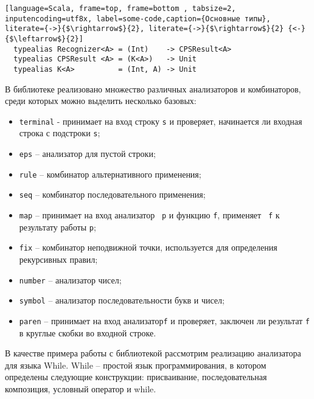 \documentclass[14pt]{matmex-diploma}
\begin{document}
  \begin{lstlisting}[language=Scala, frame=top, frame=bottom , tabsize=2, inputencoding=utf8x, label=some-code,caption={Основные типы}, literate={->}{$\rightarrow$}{2}, literate={->}{$\rightarrow$}{2} {<-}{$\leftarrow$}{2}]
  typealias Recognizer<A> = (Int)    -> CPSResult<A> 
  typealias CPSResult <A> = (K<A>)   -> Unit
  typealias K<A>          = (Int, A) -> Unit
  \end{lstlisting}
  
  В библиотеке реализовано множество различных анализаторов и комбинаторов, среди которых можно выделить несколько базовых:
  \begin{itemize}
      \item \lstinline[language=Scala]{terminal} - принимает на вход строку \lstinline[language=Scala]{s} и проверяет, начинается ли входная строка с подстроки \lstinline[language=Scala]{s};
      \item \lstinline[language=Scala]{eps} -- анализатор для пустой строки;
      \item \lstinline[language=Scala]{rule} -- комбинатор альтернативного применения;
      \item \lstinline[language=Scala]{seq} -- комбинатор последовательного применения;
      \item \lstinline[language=Scala]{map} -- принимает на вход анализатор \lstinline[language=Scala]{ p} и функцию \lstinline[language=Scala]{f}, применяет \lstinline[language=Scala]{ f} к результату работы \lstinline[language=Scala]{p};
      \item \lstinline[language=Scala]{fix} -- комбинатор неподвижной точки, используется для определения рекурсивных правил;
      \item \lstinline[language=Scala]{number} -- анализатор чисел;
      \item \lstinline[language=Scala]{symbol} -- анализатор последовательности букв и чисел;
      \item \lstinline[language=Scala]{paren} -- принимает на вход анализатор\lstinline[language=Scala]{f} и проверяет, заключен ли результат \lstinline[language=Scala]{f} в круглые скобки во входной строке.
  \end{itemize}
  
   В качестве примера работы с библиотекой рассмотрим реализацию анализатора для языка While. While -- простой язык программирования, в котором определены следующие конструкции: присваивание, последовательная композиция, условный оператор и while.
   
\end{document}
